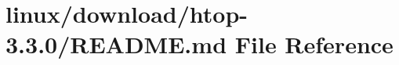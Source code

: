 \hypertarget{linux_2download_2htop-3_83_80_2README_8md}{}\section{linux/download/htop-\/3.3.0/\+R\+E\+A\+D\+ME.md File Reference}
\label{linux_2download_2htop-3_83_80_2README_8md}
